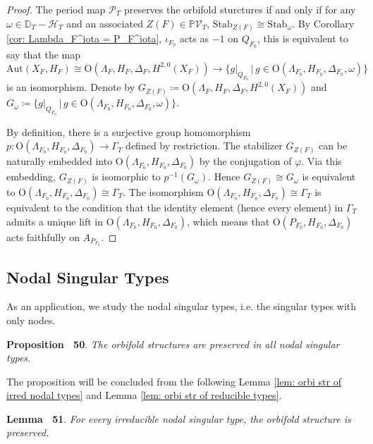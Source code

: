 \documentclass[
]{article}
\begin{document}
\emph{Proof.} The period map \(\mathscr{P}_T\) preserves the orbifold
sturctures if and only if for any
\(\omega\in \mathbb{D}_T-\mathcal{H}_T\) and an associated
\(Z(F)\in \mathbb{P}\mathcal{V}_T\),
\(\mathrm{Stab}_{Z(F)} \cong \mathrm{Stab}_\omega\). By Corollary
\ref{cor: Lambda_F^iota = P_F^iota}, \(\iota_{F_0}\) acts as \(-1\) on
\(Q_{F_0}\), this is equivalent to say that the map
\[\mathrm{Aut}(X_F,H_F)\cong \mathrm{O}(\Lambda_F,H_F,\Delta_F,H^{2,0}(X_F)) \to \{ g|_{Q_{F_0}} \,\big|\, g\in \mathrm{O}(\Lambda_{F_0},H_{F_0},\Delta_{F_0},\omega) \}\]
is an isomorphism. Denote by
\(G_{Z(F)}\coloneqq \mathrm{O}(\Lambda_F,H_F,\Delta_F,H^{2,0}(X_F))\)
and
\(G_\omega\coloneqq \{ g|_{Q_{F_0}} \,\big|\, g\in \mathrm{O}(\Lambda_{F_0},H_{F_0},\Delta_{F_0},\omega) \}\).

By definition, there is a surjective group homomorphism
\(p\colon \mathrm{O}(\Lambda_{F_0},H_{F_0},\Delta_{F_0})\to \Gamma_T\)
defined by restriction. The stabilizer \(G_{Z(F)}\) can be naturally
embedded into \(\mathrm{O}(\Lambda_{F_0},H_{F_0},\Delta_{F_0})\) by the
conjugation of \(\varphi\). Via this embedding, \(G_{Z(F)}\) is
isomorphic to \(p^{-1}(G_\omega)\). Hence \(G_{Z(F)} \cong G_\omega\) is
equivalent to
\(\mathrm{O}(\Lambda_{F_0},H_{F_0},\Delta_{F_0}) \cong \Gamma_T\). The
isomorphism
\(\mathrm{O}(\Lambda_{F_0},H_{F_0},\Delta_{F_0}) \cong \Gamma_T\) is
equivalent to the condition that the identity element (hence every
element) in \(\Gamma_T\) admits a unique lift in
\(\mathrm{O}(\Lambda_{F_0},H_{F_0},\Delta_{F_0})\), which means that
\(\mathrm{O}(P_{F_0},H_{F_0},\Delta_{F_0})\) acts faithfully on
\(A_{P_{F_0}}\).~◻

\subsection{Nodal Singular Types}\label{nodal-singular-types}

As an application, we study the nodal singular types, i.e. the singular
types with only nodes.

\textbf{Proposition~ 50}. \emph{\label{prop: orbi str of nodal types}
The orbifold structures are preserved in all nodal singular types.}

The proposition will be concluded from the following Lemma
\ref{lem: orbi str of irred nodal types} and Lemma
\ref{lem: orbi str of reducible types}.

\textbf{Lemma~ 51}. \emph{\label{lem: orbi str of irred nodal types} For
every irreducible nodal singular type, the orbifold structure is
preserved.}
\end{document}
